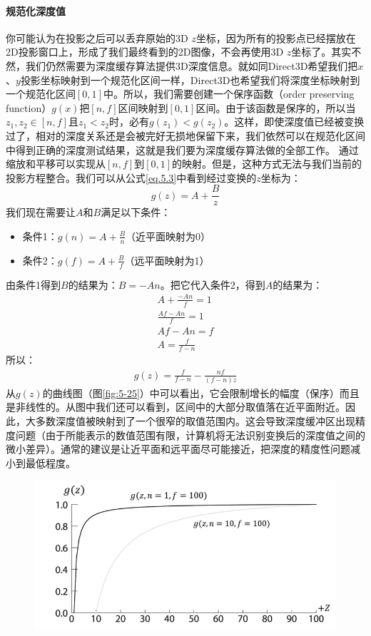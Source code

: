 \documentclass[11pt,a4paper,oldfontcommands]{memoir}
\begin{document}
{\paragraph{规范化深度值}
\begin{flushleft}
你可能认为在投影之后可以丢弃原始的3D $z$坐标，因为所有的投影点已经摆放在2D投影窗口上，形成了我们最终看到的2D图像，不会再使用3D $z$坐标了。其实不然，我们仍然需要为深度缓存算法提供3D深度信息。就如同Direct3D希望我们把$x$、$y$投影坐标映射到一个规范化区间一样，Direct3D也希望我们将深度坐标映射到一个规范化区间$[0,1]$中。所以，我们需要创建一个保序函数（order preserving function）$g(x)$把$[n,f]$区间映射到$[0,1]$区间。由于该函数是保序的，所以当$z_{1},z_{2}∈[n,f]$且$z_{1}<z_{2}$时，必有$g(z_{1})<g(z_{2})$。这样，即使深度值已经被变换过了，相对的深度关系还是会被完好无损地保留下来，我们依然可以在规范化区间中得到正确的深度测试结果，这就是我们要为深度缓存算法做的全部工作。
通过缩放和平移可以实现从$[n ,f]$到$[0,1]$的映射。但是，这种方式无法与我们当前的投影方程整合。我们可以从公式\ref{eq.5.3}中看到经过变换的$z$坐标为：
$$g(z)=A+\frac{B}{z}$$
我们现在需要让$A$和$B$满足以下条件：
\begin{itemize}
    \item 条件1：$g(n)=A+\frac{B}{n}$（近平面映射为0）
    \item 条件2：$g(f)=A+\frac{B}{f}$（远平面映射为1）
\end{itemize}
由条件1得到$B$的结果为：$B=-An$。把它代入条件2，得到$A$的结果为：
\begin{align*}
A+\frac{-An}{f}=1\\
\frac{Af-An}{f}=1\\
Af-An=f\\
A=\frac{f}{f-n}
\end{align*}
所以：
\begin{align*}
g(z)=\frac{f}{f-n}-\frac{nf}{(f-n)z}
\end{align*}
从$g(z)$的曲线图（图\ref{fig:5-25}）中可以看出，它会限制增长的幅度（保序）而且是非线性的。从图中我们还可以看到，区间中的大部分取值落在近平面附近。因此，大多数深度值被映射到了一个很窄的取值范围内。这会导致深度缓冲区出现精度问题（由于所能表示的数值范围有限，计算机将无法识别变换后的深度值之间的微小差异）。通常的建议是让近平面和远平面尽可能接近，把深度的精度性问题减小到最低程度。
\end{flushleft}
\begin{figure}[b]
    \includegraphics[width=\textwidth]{5-25}

\end{figure}}
\end{document}
